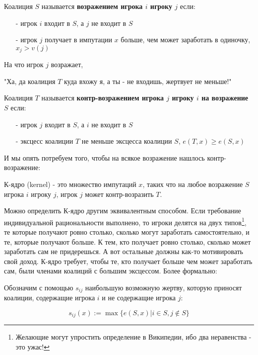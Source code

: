 \begin{definition}
Коалиция $S$ называется \textbf{возражением игрока $i$ игроку $j$} если:
\begin{itemize}
\item[-] игрок $i$ входит в $S$, а $j$ не входит в $S$
\item[-] игрок $j$ получает в импутации $x$ больше, чем может заработать в одиночку, $x_{j}>v(j)$
\end{itemize}
\end{definition}

На что игрок $j$ возражает,

"Ха, да коалиция $T$ куда вхожу я, а ты - не входишь, жертвует не меньше!"

\begin{definition}
Коалиция $T$ называется \textbf{контр-возражением игрока $j$ игроку $i$ на возражение $S$} если:
\begin{itemize}
\item[-] игрок $j$ входит в $S$, а $i$ не входит в $S$
\item[-] эксцесс коалиции $T$ не меньше эксцесса коалиции $S$, $e(T,x)\geq e(S,x)$
\end{itemize}
\end{definition}


И мы опять потребуем того, чтобы на всякое возражение нашлось контр-возражение:

\begin{definition}
К-ядро (kernel) - это множество импутаций $x$, таких что на любое возражение $S$ игрока $i$ игроку $j$, игрок $j$ может контр-возразить $T$. 
\end{definition}


Можно определить К-ядро другим эквивалентным способом. Если требование индивидуальной рациональности выполнено, то игроки делятся на двух типов\footnote{Желающие могут упростить определение в Википедии, ибо два неравенства - это ужас! }, те которые получают ровно столько, сколько могут заработать самостоятельно, и те, которые получают больше. К тем, кто получает ровно столько, сколько может заработать сам не придерешься. А вот остальные должны как-то мотивировать свой доход. К-ядро требует, чтобы те, кто получает больше чем может заработать сам, были членами коалиций с большим эксцессом. Более формально:

Обозначим с помощью $s_{ij}$ наибольшую возможную жертву, которую приносят коалиции, содержащие игрока $i$ и не содержащие игрока $j$:

\begin{equation}
s_{ij}(x):=\max\{e(S,x)|i\in S,j\notin S\}
\end{equation}

